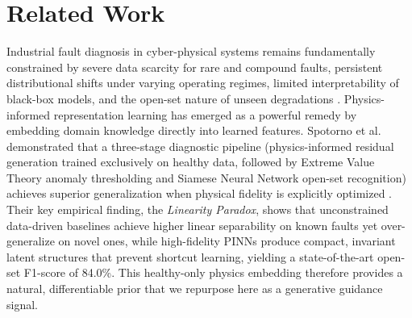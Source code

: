 \documentclass[conference]{IEEEtran}
\begin{document}
\section{Related Work}
\label{sec:related}

 
Industrial fault diagnosis in cyber-physical systems remains fundamentally constrained by severe data scarcity for rare and compound faults, persistent distributional shifts under varying operating regimes, limited interpretability of black-box models, and the open-set nature of unseen degradations \cite{huang2023compound}. Physics-informed representation learning has emerged as a powerful remedy by embedding domain knowledge directly into learned features. Spotorno et al. demonstrated that a three-stage diagnostic pipeline (physics-informed residual generation trained exclusively on healthy data, followed by Extreme Value Theory anomaly thresholding and Siamese Neural Network open-set recognition) achieves superior generalization when physical fidelity is explicitly optimized \cite{spotorno2026linking}. Their key empirical finding, the \textit{Linearity Paradox}, shows that unconstrained data-driven baselines achieve higher linear separability on known faults yet over-generalize on novel ones, while high-fidelity PINNs produce compact, invariant latent structures that prevent shortcut learning, yielding a state-of-the-art open-set F1-score of 84.0\%. This healthy-only physics embedding therefore provides a natural, differentiable prior that we repurpose here as a generative guidance signal.
 
\end{document}

